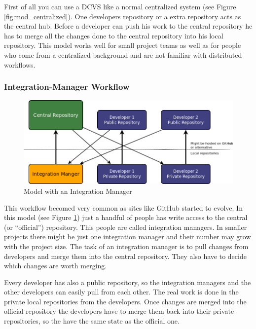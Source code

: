 First of all you can use a DCVS like a normal centralized system (see Figure \ref{fig:mod_centralized}). One developers repository or a extra repository acts as the central hub. Before a developer can push his work to the central repository he has to merge all the changes done to the central repository into his local repository. This model works well for small project teams as well as for people who come from a centralized background and are not familiar with distributed workflows.


\subsubsection{Integration-Manager Workflow}

\begin{figure}[tbp]
  \centering
  \includegraphics[width=\textwidth]{img/Mod_IntegrationManager}
  \caption{Model with an Integration Manager}
  \label{fig:mod_intMan} 
\end{figure}

This workflow becomed very common as sites like GitHub started to evolve. In
this model (see Figure \ref{fig:mod_intMan}) just a handful of people has write access to the central (or “official”) repository. 
This people are called integration managers. In smaller projects there might be just one integration manager and their 
number may grow with the project size. The task of an integration manager is to pull changes from developers and merge 
them into the central repository. They also have to decide which changes are worth merging.

Every developer has also a public repository, so the integration managers and the other developers can easily pull from 
each other. The real work is done in the private local repositories from the developers. Once changes are merged into the 
official repository the developers have to merge them back into their private repositories, so the have the same state as the official one.

